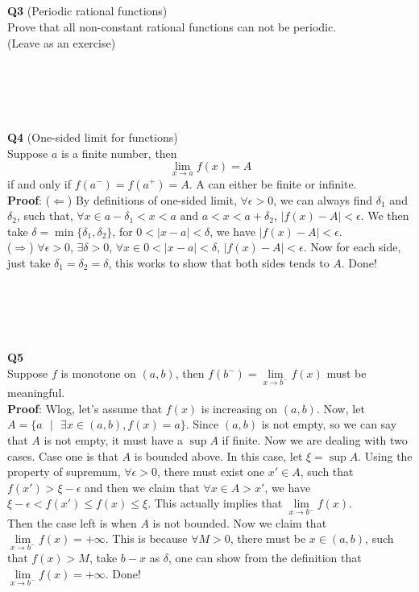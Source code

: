\documentclass{article}
\newcommand{\tb}[1]{\textbf{#1}}
\begin{document}
\\
\\
\\
\\
\tb{Q3} (Periodic rational functions)\\
Prove that all non-constant rational functions can not be periodic.\\
(Leave as an exercise)\\
\\
\\
\\
\\
\\
\tb{Q4} (One-sided limit for functions)\\
Suppose $a$ is a finite number, then 
$$
\lim_{x \to a} f(x) = A
$$
if and only if $f(a^{-}) = f(a^{+}) = A$. A can either be finite or infinite.\\
\tb{Proof}: ($\Longleftarrow$) By definitions of one-sided limit, $\forall \epsilon > 0$, we can always find $\delta_1$ and $\delta_2$, such that, 
$\forall x \in a-\delta_1 < x < a \text{ and } a< x < a + \delta_2$, $|f(x) - A| < \epsilon$. We then take $\delta = \min\{\delta_1, \delta_2\}$,
for $0< |x -a |< \delta$, we have $|f(x) - A|< \epsilon$.\\
($\Longrightarrow$) $\forall \epsilon > 0$, $\exists \delta > 0$, $\forall x \in 0 < |x - a| < \delta$, $|f(x) - A| < \epsilon$. Now for each side,
just take $\delta_1 = \delta_2 = \delta$, this works to show that both sides tends to $A$. Done!\\
\\
\\
\\
\\
\\
\tb{Q5}\\
Suppose $f$ is monotone on $(a,b)$, then $f(b^{-}) = \lim\limits_{x \to b^{-}} f(x)$ must be meaningful.\\
\tb{Proof}: Wlog, let's assume that $f(x)$ is increasing on $(a,b)$. Now, let $A = \{a\text{ }|\text{ }\exists x \in (a,b), f(x) = a \}$. Since $(a,b)$
is not empty, so we can say that $A$ is not empty, it must have a $\sup A$ if finite. Now we are dealing with two cases. Case one is that $A$ is bounded 
above. In this case, let $\xi = \sup A$. Using the property of supremum, $\forall \epsilon > 0$, there must exist one $x' \in A$, such that $f(x') > \xi -\epsilon$ 
and then we claim that $\forall x \in A > x'$, we have $\xi - \epsilon< f(x') \leq f(x) \leq \xi$. This actually implies that $\lim\limits_{x \to b^{-}} f(x)$.\\
Then the case left is when $A$ is not bounded. Now we claim that $\lim\limits_{x \to b^{-}} f(x) = + \infty$. This is because $\forall M > 0$, there must be $x \in (a,b )$,
such that $f(x) > M$, take $b-x$ as $\delta$, one can show from the definition that $\lim\limits_{x \to b^{-}} f(x) = +\infty$. Done!\\
\newpage
\end{document}
